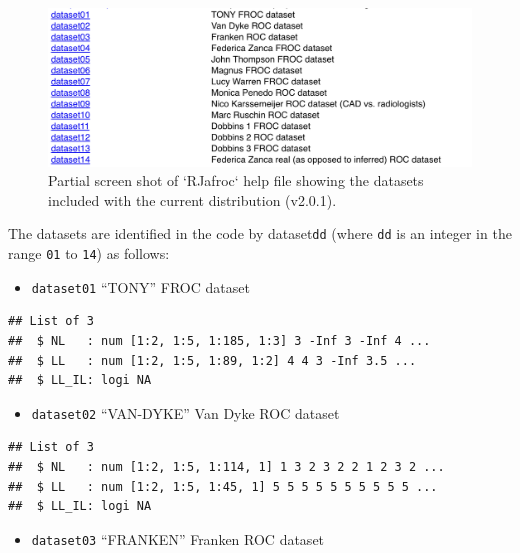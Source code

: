 \documentclass[
]{book}
\providecommand{\tightlist}{%
  \setlength{\itemsep}{0pt}\setlength{\parskip}{0pt}}
\begin{document}
\begin{figure}

{\centering \includegraphics{images/compare-3-fits/datasets} 

}

\caption{Partial screen shot of `RJafroc` help file showing the datasets included with the current distribution (v2.0.1).}\label{fig:datasets-datasets}
\end{figure}

The datasets are identified in the code by dataset\texttt{dd} (where \texttt{dd} is an integer in the range \texttt{01} to \texttt{14}) as follows:

\begin{itemize}
\tightlist
\item
  \texttt{dataset01} ``TONY'' FROC dataset \citep{RN2125}
\end{itemize}

\begin{verbatim}
## List of 3
##  $ NL   : num [1:2, 1:5, 1:185, 1:3] 3 -Inf 3 -Inf 4 ...
##  $ LL   : num [1:2, 1:5, 1:89, 1:2] 4 4 3 -Inf 3.5 ...
##  $ LL_IL: logi NA
\end{verbatim}

\begin{itemize}
\tightlist
\item
  \texttt{dataset02} ``VAN-DYKE'' Van Dyke ROC dataset \citep{RN1993}
\end{itemize}

\begin{verbatim}
## List of 3
##  $ NL   : num [1:2, 1:5, 1:114, 1] 1 3 2 3 2 2 1 2 3 2 ...
##  $ LL   : num [1:2, 1:5, 1:45, 1] 5 5 5 5 5 5 5 5 5 5 ...
##  $ LL_IL: logi NA
\end{verbatim}

\begin{itemize}
\tightlist
\item
  \texttt{dataset03} ``FRANKEN'' Franken ROC dataset \citep{RN1995}
\end{itemize}
\end{document}
